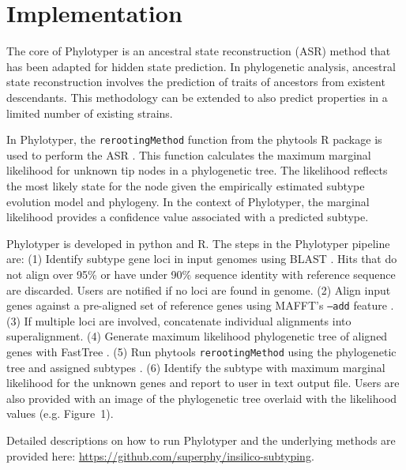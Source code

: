 \documentclass{bioinfo}
\begin{document}
\section{Implementation}

The core of Phylotyper is an ancestral state reconstruction (ASR) method that has been adapted for hidden state prediction.
In phylogenetic analysis, ancestral state reconstruction involves the prediction of traits of ancestors from existent descendants.
This methodology can be extended to also predict properties in a limited number of existing strains.

In Phylotyper, the \texttt{rerootingMethod} function from the phytools R package is used to perform the ASR \citep{Revell2011}.
This function calculates the maximum marginal likelihood for unknown tip nodes in a phylogenetic tree.
The likelihood reflects the most likely state for the node given the empirically estimated subtype evolution model and phylogeny.
In the context of Phylotyper, the marginal likelihood provides a confidence value associated with a predicted subtype.

Phylotyper is developed in python and R. 
The steps in the Phylotyper pipeline are: 
(1) Identify subtype gene loci in input genomes using BLAST \citep{Camacho2009}. Hits that do not align over 95\% or have under 90\% sequence identity with reference sequence are discarded. Users are notified if no loci are found in genome.
(2) Align input genes against a pre-aligned set of reference genes using MAFFT's \texttt{--add} feature \citep{Katoh2013}.
(3) If multiple loci are involved, concatenate individual alignments into superalignment.
(4) Generate maximum likelihood phylogenetic tree of aligned genes with FastTree \citep{Price2010}.
(5) Run phytools \texttt{rerootingMethod} using the phylogenetic tree and assigned subtypes \citep{Revell2011}.
(6) Identify the subtype with maximum marginal likelihood for the unknown genes and report to user in text output file.
Users are also provided with an image of the phylogenetic tree overlaid with the likelihood values (e.g. Figure~1\vphantom{\ref{fig:01}}).

Detailed descriptions on how to run Phylotyper and the underlying methods are provided here: \url{https://github.com/superphy/insilico-subtyping}.
\end{document}
